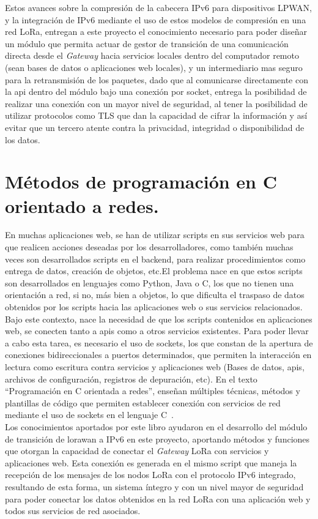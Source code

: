 \begin{justify}
Estos avances sobre la compresión de la cabecera IPv6 para dispositivos LPWAN, y la integración de IPv6 mediante el uso de estos modelos de compresión en una red LoRa, entregan a este proyecto el conocimiento necesario para poder diseñar un módulo que permita actuar de gestor de transición de una comunicación directa desde el \textit{Gateway} hacia servicios locales dentro del computador remoto (sean bases de datos o aplicaciones web locales), y un intermediario mas seguro para la retransmisión de los paquetes, dado que al comunicarse directamente con la \gls{api} dentro del módulo bajo una conexión por \gls{socket}, entrega la posibilidad de realizar una conexión con un mayor nivel de seguridad, al tener la posibilidad de utilizar protocolos como TLS que dan la capacidad de cifrar la información y así evitar que un tercero atente contra la privacidad, integridad o disponibilidad de los datos.
\newpage
\section{Métodos de programación en C orientado a redes.}
En muchas aplicaciones web, se han de utilizar scripts en sus servicios web para que realicen acciones deseadas por los desarrolladores, como también muchas veces son desarrollados scripts en el backend, para realizar procedimientos como entrega de datos, creación de objetos, etc.El problema nace en que estos scripts son desarrollados en lenguajes como Python, Java o C, los que no tienen una orientación a red, si no, más bien a objetos, lo que dificulta el traspaso de datos obtenidos por los scripts hacia las aplicaciones web o sus servicios relacionados.\\
Bajo este contexto, nace la necesidad de que los scripts contenidos en aplicaciones web, se conecten tanto a \glspl{api} como a otros servicios existentes. Para poder llevar a cabo esta tarea, es necesario el uso de \glspl{socket}, los que constan de la apertura de conexiones bidireccionales a puertos determinados, que permiten la interacción en lectura como escritura contra servicios y aplicaciones web (Bases de datos, \glspl{api}, archivos de configuración, registros de depuración, etc). En el texto ``Programación en C orientada a redes'', enseñan múltiples técnicas, métodos y plantillas de código que permiten establecer conexión con servicios de red mediante el uso de \glspl{socket} en el lenguaje C~\cite{network}.\\
Los conocimientos aportados por este libro ayudaron en el desarrollo del módulo de transición de \gls{lorawan} a IPv6 en este proyecto, aportando métodos y funciones que otorgan la capacidad de conectar el \textit{Gateway} LoRa con servicios y aplicaciones web. Esta conexión es generada en el mismo script que maneja la recepción de los mensajes de los nodos LoRa con el protocolo IPv6 integrado, resultando de esta forma, un sistema íntegro y con un nivel mayor de seguridad para poder conectar los datos obtenidos en la red LoRa con una aplicación web y todos sus servicios de red asociados.
\end{justify}
